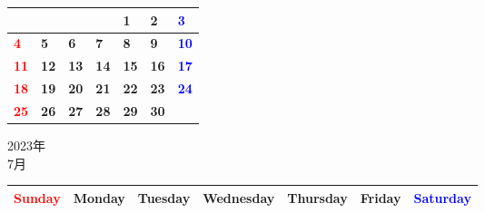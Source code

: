 \documentclass[a4paper,landscape]{jsarticle}
\newcommand{\dig}{\hspace{29mm}}
\newcommand{\tdig}{\hspace{27mm}}
\newcommand{\LBF}{\LARGE\textbf}
\begin{document}
\begingroup
\renewcommand{\arraystretch}{4}
\begin{tabular}{|p{32mm}|p{32mm}|p{32mm}|p{32mm}|p{32mm}|p{32mm}|p{32mm}|}
\hline
&&&&\raisebox{30pt} {\dig\LBF{1}}&\raisebox{30pt} {\dig\LBF{2}}&\raisebox{30pt} {\dig\textcolor{blue}{\LBF{3}}}\\
\hline
\raisebox{30pt} {\dig\textcolor{red}{\LBF{4}}}&\raisebox{30pt} {\dig\LBF{5}}&\raisebox{30pt} {\dig\LBF{6}}&\raisebox{30pt} {\dig\LBF{7}}&\raisebox{30pt} {\dig\LBF{8}}&\raisebox{30pt} {\dig\LBF{9}}&\raisebox{30pt} {\tdig\textcolor{blue}{\LBF{10}}}\\
\hline
\raisebox{30pt} {\tdig\textcolor{red}{\LBF{11}}}&\raisebox{30pt} {\tdig\LBF{12}}&\raisebox{30pt} {\tdig\LBF{13}}&\raisebox{30pt} {\tdig\LBF{14}}&\raisebox{30pt} {\tdig\LBF{15}}&\raisebox{30pt} {\tdig\LBF{16}}&\raisebox{30pt} {\tdig\textcolor{blue}{\LBF{17}}}\\
\hline
\raisebox{30pt} {\tdig\textcolor{red}{\LBF{18}}}&\raisebox{30pt} {\tdig\LBF{19}}&\raisebox{30pt} {\tdig\LBF{20}}&\raisebox{30pt} {\tdig\LBF{21}}&\raisebox{30pt} {\tdig\LBF{22}}&\raisebox{30pt} {\tdig\LBF{23}}&\raisebox{30pt} {\tdig\textcolor{blue}{\LBF{24}}}\\
\hline
\raisebox{30pt} {\tdig\textcolor{red}{\LBF{25}}}&\raisebox{30pt} {\tdig\LBF{26}}&\raisebox{30pt} {\tdig\LBF{27}}&\raisebox{30pt} {\tdig\LBF{28}}&\raisebox{30pt} {\tdig\LBF{29}}&\raisebox{30pt} {\tdig\LBF{30}}&\\
\hline
\end{tabular}
\endgroup

\newpage

\begin{center}
	\LARGE 2023年\\
	\LARGE 7月
\end{center}

\begingroup
\renewcommand{\arraystretch}{1.4}
\begin{tabular}{|>{\centering\arraybackslash}p{32mm}|>{\centering\arraybackslash}p{32mm}|>{\centering\arraybackslash}p{32mm}|>{\centering\arraybackslash}p{32mm}|>{\centering\arraybackslash}p{32mm}|>{\centering\arraybackslash}p{32mm}|>{\centering\arraybackslash}p{32mm}|}
\hline
\textcolor{red}{\large Sunday}&\large Monday&\large Tuesday&\large Wednesday&\large Thursday&\large Friday&\textcolor{blue}{\large Saturday}\\
\hline
\end{tabular}
\endgroup
\end{document}
